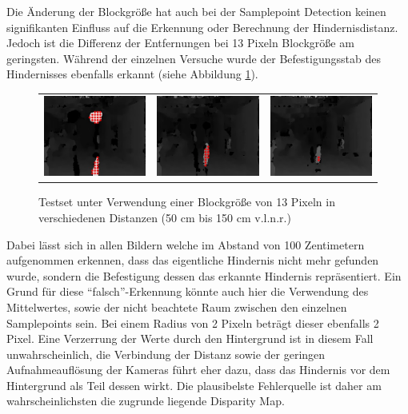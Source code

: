 \noindent
Die Änderung der Blockgröße hat auch bei der Samplepoint Detection keinen signifikanten Einfluss auf die Erkennung oder Berechnung der Hindernisdistanz. Jedoch ist die Differenz der Entfernungen bei 13 Pixeln Blockgröße am geringsten. Während der einzelnen Versuche wurde der Befestigungsstab des Hindernisses ebenfalls erkannt (siehe Abbildung \ref{fig:distance_sample_images}).

\begin{figure}[h]
	\centering
	\begin{tabular}{ccc}
	\includegraphics[width=4cm]{img/evaluation/distance_sample/_test_0_disparity}&
	\includegraphics[width=4cm]{img/evaluation/distance_sample/_test_1_disparity}&
	\includegraphics[width=4cm]{img/evaluation/distance_sample/_test_2_disparity}
	\end{tabular}
	\caption{Testset unter Verwendung einer Blockgröße von 13 Pixeln in verschiedenen Distanzen (50 cm bis 150 cm v.l.n.r.)}
	\label{fig:distance_sample_images}
\end{figure}

\noindent
Dabei lässt sich in allen Bildern welche im Abstand von 100 Zentimetern aufgenommen erkennen, dass das eigentliche Hindernis nicht mehr gefunden wurde, sondern die Befestigung dessen das erkannte Hindernis repräsentiert. Ein Grund für diese \enquote{falsch}-Erkennung könnte auch hier die Verwendung des Mittelwertes, sowie der nicht beachtete Raum zwischen den einzelnen Samplepoints sein. Bei einem Radius von 2 Pixeln beträgt dieser ebenfalls 2 Pixel. Eine Verzerrung der Werte durch den Hintergrund ist in diesem Fall unwahrscheinlich, die Verbindung der Distanz sowie der geringen Aufnahmeauflösung der Kameras führt eher dazu, dass das Hindernis vor dem Hintergrund als Teil dessen wirkt. Die plausibelste Fehlerquelle ist daher am wahrscheinlichsten die zugrunde liegende Disparity Map.

